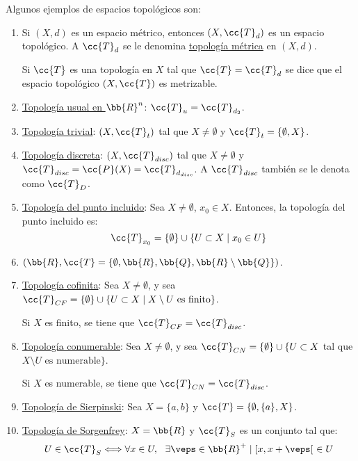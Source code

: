 \begin{ejemplo} Algunos ejemplos de espacios topológicos son:
    \begin{enumerate}
        \item Si $(X,d)$ es un espacio métrico, entonces $(X,\cc{T}_d)$ es un espacio topológico. A $\cc{T}_d$ se le denomina \ul{topología métrica} en $(X,d)$.

        Si $\cc{T}$ es una topología en $X$ tal que $\cc{T}=\cc{T}_d$ se dice que el espacio topológico $(X,\cc{T})$ es metrizable.

        \item \ul{Topología usual en $\bb{R}^n$}:  $\cc{T}_u=\cc{T}_{d_2}$.

        \item \ul{Topología trivial}: $(X,\cc{T}_t)$ tal que $X\neq \emptyset$ y $\cc{T}_t=\{\emptyset, X\}$.

        \item \ul{Topología discreta}: $(X,\cc{T}_{disc})$ tal que $X\neq \emptyset$ y $\cc{T}_{disc}=\cc{P}(X)=\cc{T}_{d_{disc}}$. A $\cc{T}_{disc}$ también se le denota como $\cc{T}_D$.

        \item \ul{Topología del punto incluido}: Sea $X\neq \emptyset$, $x_0\in X$. Entonces, la topología del punto incluido es:
        \begin{equation*}
            \cc{T}_{x_0}=\{\emptyset\}\cup \{U\subset X\mid x_0\in U\}
        \end{equation*}

        \item $(\bb{R}, \cc{T}=\{\emptyset, \bb{R}, \bb{Q}, \bb{R}\setminus \bb{Q}\})$.

        \item \ul{Topología cofinita}: Sea $X\neq \emptyset$, y sea $\cc{T}_{CF}=\{\emptyset\}\cup \{U\subset X\mid X\setminus U \text{ es finito}\}$.

        Si $X$ es finito, se tiene que $\cc{T}_{CF}=\cc{T}_{disc}$.

        \item \ul{Topología conumerable}: Sea $X\neq \emptyset$, y sea $\cc{T}_{CN}=\{\emptyset\}\cup \{U\subset X$ tal que $X\setminus U \text{ es numerable}\}$.

        Si $X$ es numerable, se tiene que $\cc{T}_{CN}=\cc{T}_{disc}$.

        \item \ul{Topología de Sierpinski}: Sea $X=\{a,b\}$ y $\cc{T}=\{\emptyset, \{a\}, X\}$.

        \item \ul{Topología de Sorgenfrey}: $X=\bb{R}$ y $\cc{T}_S$ es un conjunto tal que:
        \begin{equation*}
            U\in \cc{T}_S \Longleftrightarrow \forall x\in U,~~\exists \veps\in \bb{R}^+ \mid [x,x+\veps[~\in U
        \end{equation*}
    \end{enumerate}
\end{ejemplo}


